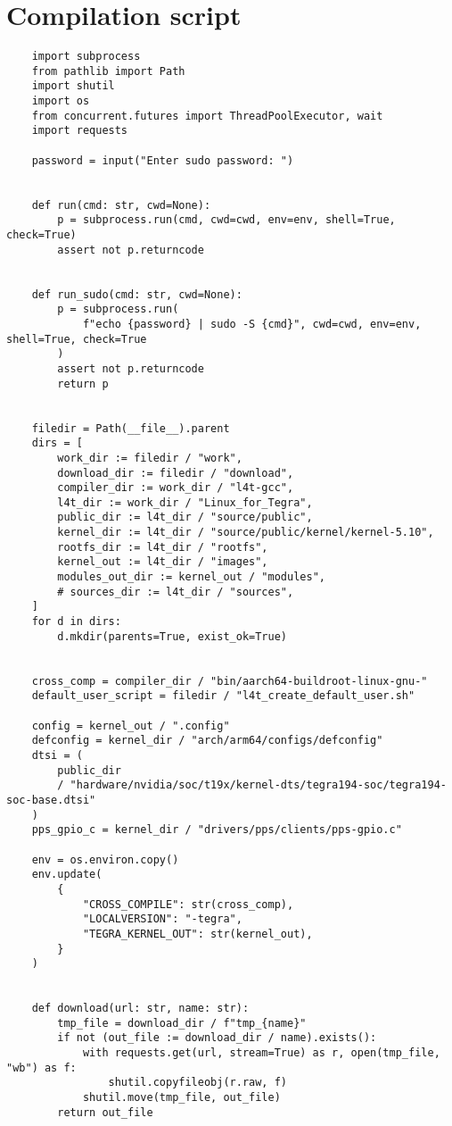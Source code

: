 \chapter{Compilation script}
\begin{verbatim}
    import subprocess
    from pathlib import Path
    import shutil
    import os
    from concurrent.futures import ThreadPoolExecutor, wait
    import requests
    
    password = input("Enter sudo password: ")
    
    
    def run(cmd: str, cwd=None):
        p = subprocess.run(cmd, cwd=cwd, env=env, shell=True, check=True)
        assert not p.returncode
    
    
    def run_sudo(cmd: str, cwd=None):
        p = subprocess.run(
            f"echo {password} | sudo -S {cmd}", cwd=cwd, env=env, shell=True, check=True
        )
        assert not p.returncode
        return p
    
    
    filedir = Path(__file__).parent
    dirs = [
        work_dir := filedir / "work",
        download_dir := filedir / "download",
        compiler_dir := work_dir / "l4t-gcc",
        l4t_dir := work_dir / "Linux_for_Tegra",
        public_dir := l4t_dir / "source/public",
        kernel_dir := l4t_dir / "source/public/kernel/kernel-5.10",
        rootfs_dir := l4t_dir / "rootfs",
        kernel_out := l4t_dir / "images",
        modules_out_dir := kernel_out / "modules",
        # sources_dir := l4t_dir / "sources",
    ]
    for d in dirs:
        d.mkdir(parents=True, exist_ok=True)
    
    
    cross_comp = compiler_dir / "bin/aarch64-buildroot-linux-gnu-"
    default_user_script = filedir / "l4t_create_default_user.sh"
    
    config = kernel_out / ".config"
    defconfig = kernel_dir / "arch/arm64/configs/defconfig"
    dtsi = (
        public_dir
        / "hardware/nvidia/soc/t19x/kernel-dts/tegra194-soc/tegra194-soc-base.dtsi"
    )
    pps_gpio_c = kernel_dir / "drivers/pps/clients/pps-gpio.c"
    
    env = os.environ.copy()
    env.update(
        {
            "CROSS_COMPILE": str(cross_comp),
            "LOCALVERSION": "-tegra",
            "TEGRA_KERNEL_OUT": str(kernel_out),
        }
    )
    
    
    def download(url: str, name: str):
        tmp_file = download_dir / f"tmp_{name}"
        if not (out_file := download_dir / name).exists():
            with requests.get(url, stream=True) as r, open(tmp_file, "wb") as f:
                shutil.copyfileobj(r.raw, f)
            shutil.move(tmp_file, out_file)
        return out_file
    

\end{verbatim}
